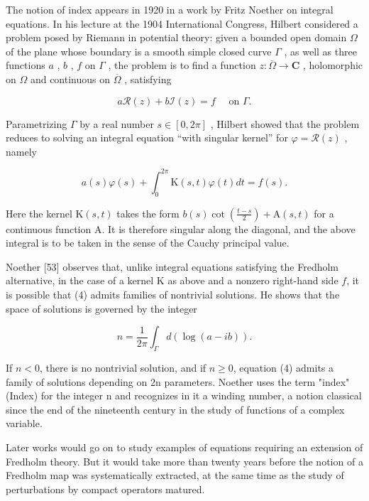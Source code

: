 
The notion of index appears in 1920 in a work by Fritz Noether on integral equations. In his lecture at the 1904 International Congress, Hilbert considered a problem posed by Riemann in potential theory: given a bounded open domain \(\Omega\) of the plane whose boundary is a smooth simple closed curve \(\Gamma\) , as well as three functions \(a\) , \(b\) , \(f\) on \(\Gamma\) , the problem is to find a function \(z: \overline{\Omega} \to \mathbf{C}\) , holomorphic on \(\Omega\) and continuous on \(\overline{\Omega}\) , satisfying

\[
a \mathcal {R} (z) + b \mathcal {I} (z) = f \quad \text { on } \Gamma .
\]

Parametrizing \(\Gamma\) by a real number \(s \in [0, 2\pi]\) , Hilbert showed that the problem reduces to solving an integral equation “with singular kernel” for \(\varphi = \mathcal{R}(z)\) , namely

\[
a (s) \varphi (s) + \int_ {0} ^ {2 \pi} \mathrm{K} (s, t) \varphi (t) d t = f (s).\tag{4}
\]

Here the kernel \(\mathrm{K}(s, t)\) takes the form \(b(s) \cot\left(\frac{t-s}{2}\right) + \mathrm{A}(s, t)\) for a continuous function A. It is therefore singular along the diagonal, and the above integral is to be taken in the sense of the Cauchy principal value.

Noether {[}53{]} observes that, unlike integral equations satisfying the Fredholm alternative, in the case of a kernel K as above and a nonzero right-hand side \(f\), it is possible that (4) admits families of nontrivial solutions. He shows that the space of solutions is governed by the integer

\[
n = \frac {1}{2 \pi} \int_ {\Gamma} d (\log (a - i b)).\tag{5}
\]

If \(n < 0\), there is no nontrivial solution, and if \(n \geqslant 0\), equation (4) admits a family of solutions depending on 2n parameters. Noether uses the term "index" (Index) for the integer n and recognizes in it a winding number, a notion classical since the end of the nineteenth century in the study of functions of a complex variable.

Later works would go on to study examples of equations requiring an extension of Fredholm theory. But it would take more than twenty years before the notion of a Fredholm map was systematically extracted, at the same time as the study of perturbations by compact operators matured.

